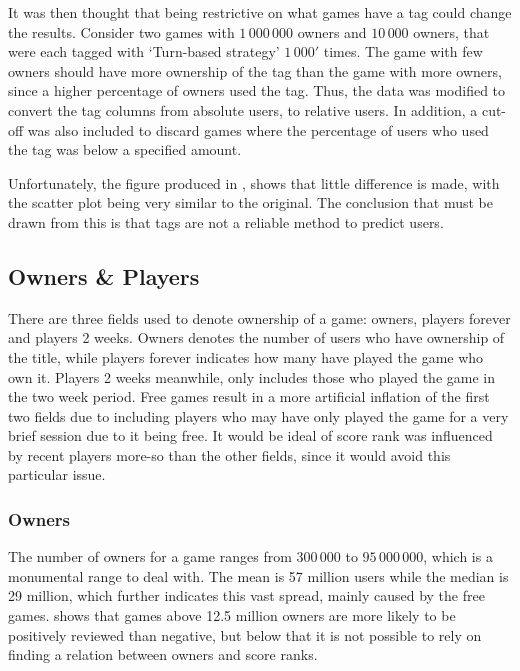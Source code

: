 \documentclass[dataset.tex]{subfiles}
\begin{document}
It was then thought that being restrictive on what games have a tag could change
the results. Consider two games with \(1\,000\,000\) owners and \(10\,000\)
owners, that were each tagged with `Turn-based strategy' \(1\,000'\) times. The
game with few owners should have more ownership of the tag than the game with
more owners, since a higher percentage of owners used the tag. Thus, the data
was modified to convert the tag columns from absolute users, to relative users.
In addition, a cut-off was also included to discard games where the percentage
of users who used the tag was below a specified amount.

Unfortunately, the figure produced in , shows that
little difference is made, with the scatter plot being very similar to the
original. The conclusion that must be drawn from this is that tags are not a
reliable method to predict users.

\subsection{Owners \& Players} %
\label{sub:owners_players}
There are three fields used to denote ownership of a game: owners, players
forever and players 2 weeks. Owners denotes the number of users who have
ownership of the title, while players forever indicates how many have played the
game who own it. Players 2 weeks meanwhile, only includes those who played the
game in the two week period.  Free games result in a more artificial inflation
of the first two fields due to including players who may have only played the
game for a very brief session due to it being free. It would be ideal of score
rank was influenced by recent players more-so than the other fields, since it
would avoid this particular issue.

\subsubsection{Owners} %
\label{ssub:owners}
The number of owners for a game ranges from \(300\,000\) to \(95\,000\,000\),
which is a monumental range to deal with. The mean is 57 million users while the
median is 29 million, which further indicates this vast spread, mainly caused by
the free games.  shows that games above 12.5 million owners
are more likely to be positively reviewed than negative, but below that it is
not possible to rely on finding a relation between owners and score ranks.
\end{document}
